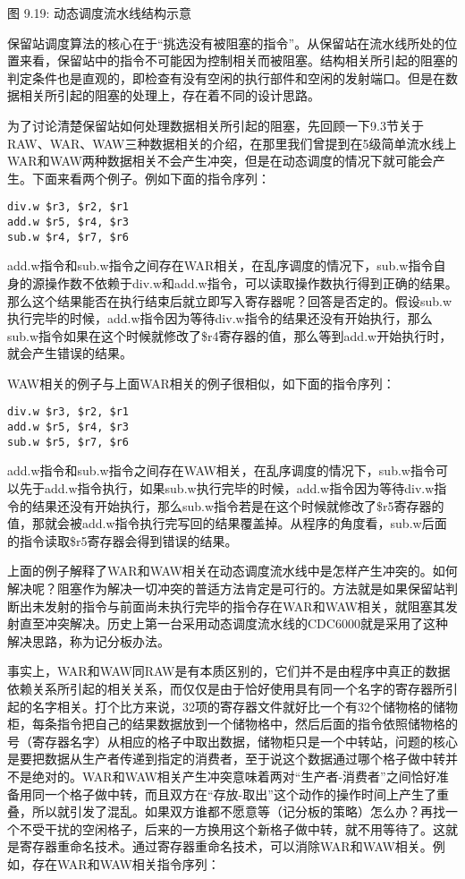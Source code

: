 \documentclass[]{ctexbook}
\begin{document}
图 9.19: 动态调度流水线结构示意

保留站调度算法的核心在于``挑选没有被阻塞的指令''。从保留站在流水线所处的位置来看，保留站中的指令不可能因为控制相关而被阻塞。结构相关所引起的阻塞的判定条件也是直观的，即检查有没有空闲的执行部件和空闲的发射端口。但是在数据相关所引起的阻塞的处理上，存在着不同的设计思路。

为了讨论清楚保留站如何处理数据相关所引起的阻塞，先回顾一下9.3节关于RAW、WAR、WAW三种数据相关的介绍，在那里我们曾提到在5级简单流水线上WAR和WAW两种数据相关不会产生冲突，但是在动态调度的情况下就可能会产生。下面来看两个例子。例如下面的指令序列：

\begin{verbatim}
div.w $r3, $r2, $r1
add.w $r5, $r4, $r3
sub.w $r4, $r7, $r6
\end{verbatim}

add.w指令和sub.w指令之间存在WAR相关，在乱序调度的情况下，sub.w指令自身的源操作数不依赖于div.w和add.w指令，可以读取操作数执行得到正确的结果。那么这个结果能否在执行结束后就立即写入寄存器呢？回答是否定的。假设sub.w执行完毕的时候，add.w指令因为等待div.w指令的结果还没有开始执行，那么sub.w指令如果在这个时候就修改了\$r4寄存器的值，那么等到add.w开始执行时，就会产生错误的结果。

WAW相关的例子与上面WAR相关的例子很相似，如下面的指令序列：

\begin{verbatim}
div.w $r3, $r2, $r1
add.w $r5, $r4, $r3
sub.w $r5, $r7, $r6
\end{verbatim}

add.w指令和sub.w指令之间存在WAW相关，在乱序调度的情况下，sub.w指令可以先于add.w指令执行，如果sub.w执行完毕的时候，add.w指令因为等待div.w指令的结果还没有开始执行，那么sub.w指令若是在这个时候就修改了\$r5寄存器的值，那就会被add.w指令执行完写回的结果覆盖掉。从程序的角度看，sub.w后面的指令读取\$r5寄存器会得到错误的结果。

上面的例子解释了WAR和WAW相关在动态调度流水线中是怎样产生冲突的。如何解决呢？阻塞作为解决一切冲突的普适方法肯定是可行的。方法就是如果保留站判断出未发射的指令与前面尚未执行完毕的指令存在WAR和WAW相关，就阻塞其发射直至冲突解决。历史上第一台采用动态调度流水线的CDC6000就是采用了这种解决思路，称为记分板办法。

事实上，WAR和WAW同RAW是有本质区别的，它们并不是由程序中真正的数据依赖关系所引起的相关关系，而仅仅是由于恰好使用具有同一个名字的寄存器所引起的名字相关。打个比方来说，32项的寄存器文件就好比一个有32个储物格的储物柜，每条指令把自己的结果数据放到一个储物格中，然后后面的指令依照储物格的号（寄存器名字）从相应的格子中取出数据，储物柜只是一个中转站，问题的核心是要把数据从生产者传递到指定的消费者，至于说这个数据通过哪个格子做中转并不是绝对的。WAR和WAW相关产生冲突意味着两对``生产者-消费者''之间恰好准备用同一个格子做中转，而且双方在``存放-取出''这个动作的操作时间上产生了重叠，所以就引发了混乱。如果双方谁都不愿意等（记分板的策略）怎么办？再找一个不受干扰的空闲格子，后来的一方换用这个新格子做中转，就不用等待了。这就是寄存器重命名技术。通过寄存器重命名技术，可以消除WAR和WAW相关。例如，存在WAR和WAW相关指令序列：
\end{document}
